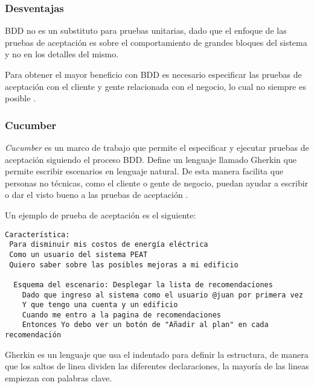 \subsubsection{Desventajas}
BDD no es un substituto para pruebas unitarias, dado que el enfoque de
las pruebas de aceptación es sobre el comportamiento de grandes bloques
del sistema y no en los detalles del mismo.

Para obtener el mayor beneficio con BDD es necesario especificar las pruebas
de aceptación con el cliente y gente relacionada con el negocio, lo cual no
siempre es posible \cite{12_rappin_2010}.

\subsubsection{Cucumber}
\textit{Cucumber} es un marco de trabajo que permite el especificar y ejecutar
pruebas de aceptación siguiendo el proceso BDD. Define un lenguaje llamado
Gherkin que permite escribir escenarios en lenguaje natural. De esta manera
facilita que personas no técnicas, como el cliente o gente de negocio,
puedan ayudar a escribir o dar el visto bueno a las pruebas de aceptación
\cite{23_chelimsky_2010}.

\vspace{2.5mm}

Un ejemplo de prueba de aceptación es el siguiente:
\begin{lstlisting}
Característica:
 Para disminuir mis costos de energía eléctrica
 Como un usuario del sistema PEAT
 Quiero saber sobre las posibles mejoras a mi edificio

  Esquema del escenario: Desplegar la lista de recomendaciones
    Dado que ingreso al sistema como el usuario @juan por primera vez
    Y que tengo una cuenta y un edificio
    Cuando me entro a la pagina de recomendaciones
    Entonces Yo debo ver un botón de "Añadir al plan" en cada recomendación
\end{lstlisting}

Gherkin es un lenguaje que usa el indentado para definir la estructura, de manera
que los saltos de linea dividen las diferentes declaraciones,
la mayoría de las lineas empiezan con palabras clave.


\vspace{2.5mm}

